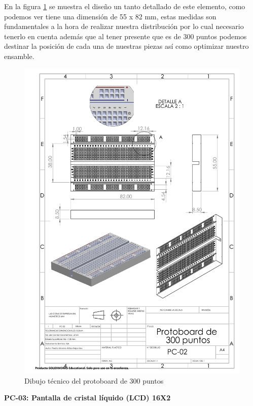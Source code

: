    En la figura \ref{fig:proto} se muestra el diseño un tanto detallado de este elemento, como podemos ver tiene una dimensión de 55 x 82 mm, estas medidas son fundamentales a la hora de realizar nuestra distribución por lo cual necesario tenerlo en cuenta además que al tener presente que es de 300 puntos podemos destinar la posición de cada una de nuestras piezas así como optimizar nuestro ensamble.
    
    \begin{figure}[H]
        \centering
        \includegraphics[trim = {22mm 149mm 21mm 56mm},clip,scale=0.4]{22/Img/protoDibujo.pdf}
        \caption{Dibujo técnico del protoboard de 300 puntos}
        \label{fig:proto}
    \end{figure}
    
    \textbf{PC-03: Pantalla de cristal líquido (LCD) 16X2}
    
